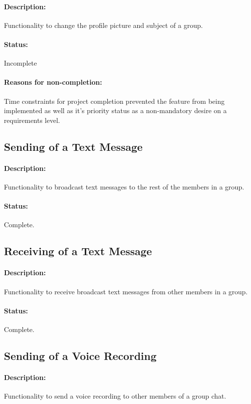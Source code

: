\documentclass[11pt]{article}
\begin{document}
\paragraph{Description:} Functionality to change the profile picture and subject of a group.
\paragraph{Status:} Incomplete
\paragraph{Reasons for non-completion:} Time constraints for project completion prevented the feature from being implemented as well as it's priority status as a non-mandatory desire on a requirements level.

\subsection{Sending of a Text Message}
\paragraph{Description:} Functionality to broadcast text messages to the rest of the members in a group.
\paragraph{Status:} Complete.

\subsection{Receiving of a Text Message}
\paragraph{Description:} Functionality to receive broadcast text messages from other members in a group.
\paragraph{Status:} Complete.

\subsection{Sending of a Voice Recording}
\paragraph{Description:} Functionality to send a voice recording to other members of a group chat.
\end{document}
